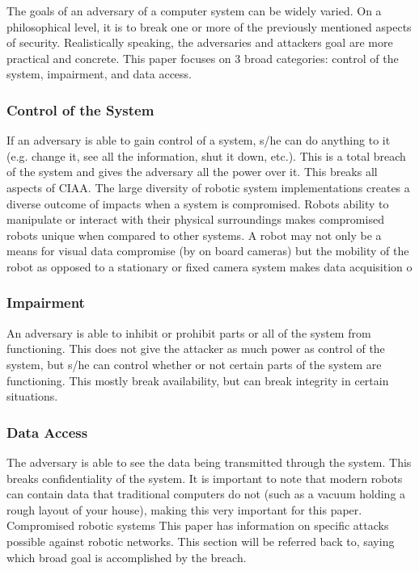 The goals of an adversary of a computer system can be widely varied. On a philosophical level, it is to break one or more of the previously mentioned aspects of security. Realistically speaking, the adversaries and attackers goal are more practical and concrete. This paper focuses on 3 broad categories: control of the system, impairment, and data access.
\\  %
\subsubsection{Control of the System}
If an adversary is able to gain control of a system, s/he can do anything to it (e.g. change it, see all the information, shut it down, etc.). This is a total breach of the system and gives the adversary all the power over it. This breaks all aspects of CIAA. 
The large diversity of robotic system implementations creates a diverse outcome of impacts when a system is compromised.  Robots ability to manipulate or interact with their physical surroundings makes compromised robots unique when compared to other systems.  A robot may not only be a means for visual data compromise (by on board cameras) but the mobility of the robot as opposed to a stationary or fixed camera system makes data acquisition o
\subsubsection{Impairment}
An adversary is able to inhibit or prohibit parts or all of the system from functioning. This does not give the attacker as much power as control of the system, but s/he can control whether or not certain parts of the system are functioning. This mostly break availability, but can break integrity in certain situations. 
\subsubsection{Data Access}
The adversary is able to see the data being transmitted through the system. This breaks confidentiality of the system. It is important to note that modern robots can contain data that traditional computers do not (such as a vacuum holding a rough layout of your house), making this very important for this paper.
\\
Compromised robotic systems 
This paper has information on specific attacks possible against robotic networks. This section will be referred back to, saying which broad goal is accomplished by the breach.

